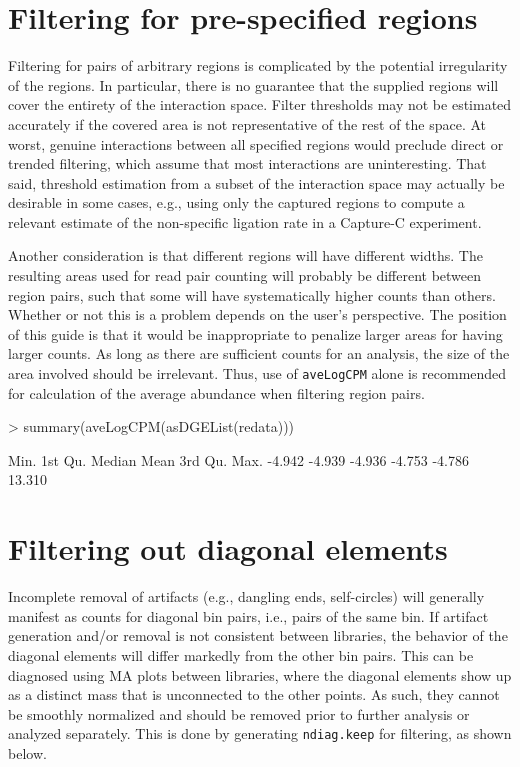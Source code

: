 \documentclass[12pt]{report}
\renewenvironment{Schunk}{\vspace{0pt}}{\vspace{0pt}}
\newcommand{\code}[1]{{\small\texttt{#1}}}
\begin{document}
\section{Filtering for pre-specified regions}
Filtering for pairs of arbitrary regions is complicated by the potential irregularity of the regions.
In particular, there is no guarantee that the supplied regions will cover the entirety of the interaction space.
Filter thresholds may not be estimated accurately if the covered area is not representative of the rest of the space.
At worst, genuine interactions between all specified regions would preclude direct or trended filtering, which assume that most interactions are uninteresting.
That said, threshold estimation from a subset of the interaction space may actually be desirable in some cases, e.g., using only the captured regions to compute a relevant estimate of the non-specific ligation rate in a Capture-C experiment.

Another consideration is that different regions will have different widths.
The resulting areas used for read pair counting will probably be different between region pairs, such that some will have systematically higher counts than others.
Whether or not this is a problem depends on the user's perspective.
The position of this guide is that it would be inappropriate to penalize larger areas for having larger counts. 
As long as there are sufficient counts for an analysis, the size of the area involved should be irrelevant.
Thus, use of \code{aveLogCPM} alone is recommended for calculation of the average abundance when filtering region pairs.

\begin{Schunk}
\begin{Sinput}
> summary(aveLogCPM(asDGEList(redata)))
\end{Sinput}
\begin{Soutput}
   Min. 1st Qu.  Median    Mean 3rd Qu.    Max. 
 -4.942  -4.939  -4.936  -4.753  -4.786  13.310 
\end{Soutput}
\end{Schunk}

\section{Filtering out diagonal elements}
Incomplete removal of artifacts (e.g., dangling ends, self-circles) will generally manifest as counts for diagonal bin pairs, i.e., pairs of the same bin.
If artifact generation and/or removal is not consistent between libraries, the behavior of the diagonal elements will differ markedly from the other bin pairs.
This can be diagnosed using MA plots between libraries, where the diagonal elements show up as a distinct mass that is unconnected to the other points.
As such, they cannot be smoothly normalized and should be removed prior to further analysis or analyzed separately.
This is done by generating \code{ndiag.keep} for filtering, as shown below.
\end{document}
